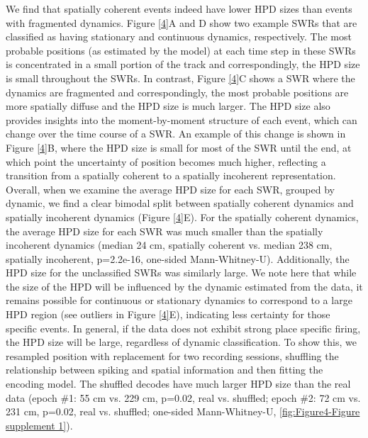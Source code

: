 \documentclass[times, twoside]{zHenriquesLab-StyleBioRxiv}
\begin{document}
We find that spatially coherent events indeed have lower HPD sizes than events with fragmented dynamics. Figure \ref{4}A and D show two example SWRs that are classified as having stationary and continuous dynamics, respectively. The most probable positions (as estimated by the model) at each time step in these SWRs is concentrated in a small portion of the track and correspondingly, the HPD size is small throughout the SWRs. In contrast, Figure \ref{4}C shows a SWR where the dynamics are fragmented and correspondingly, the most probable positions are more spatially diffuse and the HPD size is much larger. The HPD size also provides insights into the moment-by-moment structure of each event, which can change over the time course of a SWR. An example of this change is shown in Figure \ref{4}B, where the HPD size is small for most of the SWR until the end, at which point the uncertainty of position becomes much higher, reflecting a transition from a spatially coherent to a spatially incoherent representation. Overall, when we examine the average HPD size for each SWR, grouped by dynamic, we find a clear bimodal split between spatially coherent dynamics and spatially incoherent dynamics (Figure \ref{4}E). For the spatially coherent dynamics, the average HPD size for each SWR was much smaller than the spatially incoherent dynamics (median 24 cm, spatially coherent vs. median 238 cm, spatially incoherent, p=2.2e-16, one-sided Mann-Whitney-U). Additionally, the HPD size for the unclassified SWRs was similarly large. We note here that while the size of the HPD will be influenced by the dynamic estimated from the data, it remains possible for continuous or stationary dynamics to correspond to a large HPD region (see outliers in Figure \ref{4}E), indicating less certainty for those specific events. In general, if the data does not exhibit strong place specific firing, the HPD size will be large, regardless of dynamic classification. To show this, we resampled position with replacement for two recording sessions, shuffling the relationship between spiking and spatial information and then fitting the encoding model. The shuffled decodes have much larger HPD size than the real data (epoch \#1: 55 cm vs. 229 cm, p=0.02, real vs. shuffled; epoch \#2: 72 cm vs. 231 cm, p=0.02, real vs. shuffled; one-sided Mann-Whitney-U, \ref{fig:Figure4-Figure supplement 1}).
\end{document}
